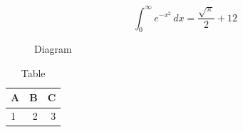 \documentclass[11pt]{article}
\begin{document}
\begin{equation}\label{eq:12} \int_0^\infty e^{-x^2}\,dx = \frac{\sqrt{\pi}}{2} + 12\end{equation}
\begin{figure}[h]\centering{}\caption{Diagram}\end{figure}
\begin{table}[h]\centering\begin{tabular}{lrr}\toprule A&B&C\\\midrule 1&2&3\\\bottomrule\end{tabular}\caption{Table}\end{table}
\end{document}
